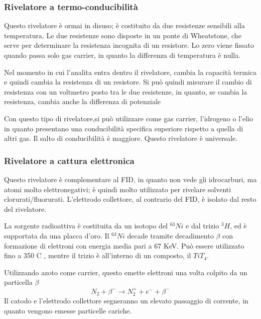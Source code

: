 \subsubsection{Rivelatore a termo-conducibilità}
Questo rivelatore è ormai in disuso; è costituito da due resistenze sensibili alla temperatura. Le due resistenze sono disposte in un ponte di Wheatstone, che serve per determinare la resistenza incognita di un resistore. Lo zero viene fissato quando passa solo gas carrier, in quanto la differenza di temperatura è nulla.


Nel momento in cui l'analita entra dentro il rivelatore, cambia la capacità termica e quindi cambia la resistenza di un resistore. Si può quindi misurare il cambio di resistenza con un voltmetro posto tra le due resistenze, in quanto, se cambia la resistenza, cambia anche la differenza di potenziale

Con questo tipo di rivelatore,si può utilizzare come gas carrier, l'idrogeno o l'elio in quanto presentano una conducibilità specifica superiore rispetto a quella di altri gas. Il salto di conducibilità è maggiore. Questo rivelatore è universale.

\subsubsection{Rivelatore a cattura elettronica}
Questo rivelatore è complementare al FID, in quanto non vede gli idrocarburi, ma atomi molto elettronegativi; è quindi molto utilizzato per rivelare solventi clorurati/fluorurati. L'elettrodo collettore, al contrario del FID, è isolato dal resto del rivelatore.


La sorgente radioattiva è costituita da un isotopo del $^{63}Ni$ e dal trizio $^3H$, ed è supportata da una placca d'oro. Il $^{63}Ni$ decade tramite decadimento $\beta$ con formazione di elettroni con energia media pari a $67$ KeV. Può essere utilizzato fino a 350 C \degree , mentre il trizio è all'interno di un composto, il $TiT_4$.

Utilizzando azoto come carrier, questo emette elettroni una volta colpito da un particella $\beta$
\[
N_2 + \beta^- \rightarrow N_2^+ + e^- + \beta^-
\]
Il catodo e l'elettrodo collettore segneranno un elevato passaggio di corrente, in quanto vengono emesse particelle cariche.

